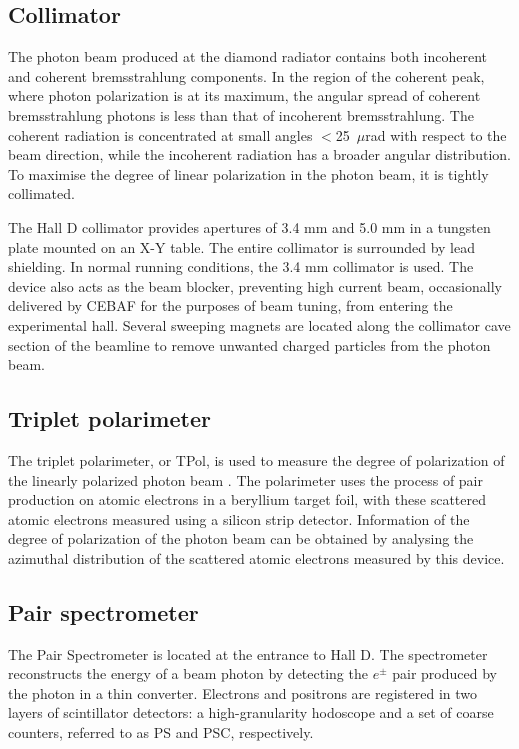 \subsection{Collimator}
The photon beam produced at the diamond radiator contains both incoherent and coherent bremsstrahlung components.
In the region of the coherent peak, where photon polarization is at its maximum, the angular spread of coherent bremsstrahlung photons is less than that of incoherent bremsstrahlung.
The coherent radiation is concentrated at small angles $<$25~$\mu$rad with respect to the beam direction, while the incoherent radiation has a broader angular distribution.
To maximise the degree of linear polarization in the photon beam, it is tightly collimated.

The Hall D collimator provides apertures of 3.4 mm and 5.0 mm in a tungsten plate mounted on an X-Y table.
The entire collimator is surrounded by lead shielding.
In normal \GX{} running conditions, the 3.4 mm collimator is used.
The device also acts as the beam blocker, preventing high current beam, occasionally delivered by CEBAF for the purposes of beam tuning, from entering the experimental hall.
Several sweeping magnets are located along the collimator cave section of the beamline to remove unwanted charged particles from the photon beam.

\subsection{Triplet polarimeter \label{sec:tpol}}
The triplet polarimeter, or TPol, is used to measure the degree of polarization of the linearly polarized photon beam \cite{DUGGER2017115}.
The polarimeter uses the process of pair production on atomic electrons in a beryllium target foil, with these scattered atomic electrons measured using a silicon strip detector.
Information of the degree of polarization of the photon beam can be obtained by analysing the azimuthal distribution of the scattered atomic electrons measured by this device.

\subsection{Pair spectrometer \label{sec:ps}}

The Pair Spectrometer \cite{BARBOSA2015376} is located at the entrance to Hall D.
The spectrometer reconstructs the
energy of a beam photon by detecting the $e^\pm$ pair produced by the
photon in a thin converter. 
Electrons and positrons are registered in two layers of scintillator
detectors: a high-granularity hodoscope and a set of coarse counters,
referred to as PS and PSC, respectively.

